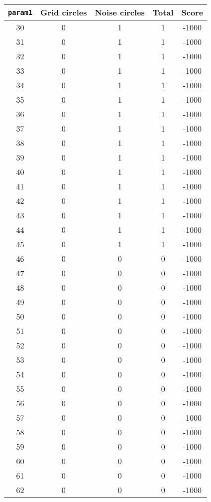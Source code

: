\documentclass[letterpaper, 12pt]{article}
\begin{document}
\begin{longtable}{|c|c|c|c|c|}
\hline
\textbf{\texttt{param1}} & \textbf{Grid circles} & \textbf{Noise circles} & \textbf{Total} & \textbf{Score} \\
\hline
30 & 0 & 1 & 1 & -1000 \\
\hline
31 & 0 & 1 & 1 & -1000 \\
\hline
32 & 0 & 1 & 1 & -1000 \\
\hline
33 & 0 & 1 & 1 & -1000 \\
\hline
34 & 0 & 1 & 1 & -1000 \\
\hline
35 & 0 & 1 & 1 & -1000 \\
\hline
36 & 0 & 1 & 1 & -1000 \\
\hline
37 & 0 & 1 & 1 & -1000 \\
\hline
38 & 0 & 1 & 1 & -1000 \\
\hline
39 & 0 & 1 & 1 & -1000 \\
\hline
40 & 0 & 1 & 1 & -1000 \\
\hline
41 & 0 & 1 & 1 & -1000 \\
\hline
42 & 0 & 1 & 1 & -1000 \\
\hline
43 & 0 & 1 & 1 & -1000 \\
\hline
44 & 0 & 1 & 1 & -1000 \\
\hline
45 & 0 & 1 & 1 & -1000 \\
\hline
46 & 0 & 0 & 0 & -1000 \\
\hline
47 & 0 & 0 & 0 & -1000 \\
\hline
48 & 0 & 0 & 0 & -1000 \\
\hline
49 & 0 & 0 & 0 & -1000 \\
\hline
50 & 0 & 0 & 0 & -1000 \\
\hline
51 & 0 & 0 & 0 & -1000 \\
\hline
52 & 0 & 0 & 0 & -1000 \\
\hline
53 & 0 & 0 & 0 & -1000 \\
\hline
54 & 0 & 0 & 0 & -1000 \\
\hline
55 & 0 & 0 & 0 & -1000 \\
\hline
56 & 0 & 0 & 0 & -1000 \\
\hline
57 & 0 & 0 & 0 & -1000 \\
\hline
58 & 0 & 0 & 0 & -1000 \\
\hline
59 & 0 & 0 & 0 & -1000 \\
\hline
60 & 0 & 0 & 0 & -1000 \\
\hline
61 & 0 & 0 & 0 & -1000 \\
\hline
62 & 0 & 0 & 0 & -1000 \\

\end{longtable}
\end{document}
